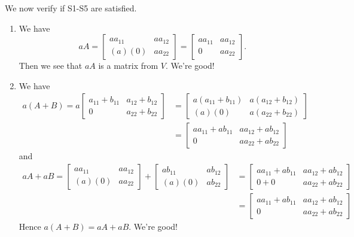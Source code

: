 \documentclass[12pt]{article}
\begin{document}
\begin{enumerate}
		We now verify if S1-S5 are satisfied.
			\begin{enumerate}[label=S\arabic*.]
				\item We have 
					\[
						a A = \begin{bmatrix} a a_{11} & a a_{12} \\ (a)(0) & a a_{22} \end{bmatrix} = \begin{bmatrix} a a_{11} & a a_{12} \\ 0 & a a_{22} \end{bmatrix} .
					\]
				Then we see that $aA$ is a matrix from $V$. We're good!
				\item We have
					\begin{align*}
						a (A + B) = a \begin{bmatrix} a_{11} + b_{11} & a_{12} + b_{12} \\ 0 & a_{22} + b_{22} \end{bmatrix} &= \begin{bmatrix} a (a_{11} + b_{11}) & a (a_{12} + b_{12}) \\ (a) (0) & a (a_{22} + b_{22} ) \end{bmatrix} \\ 
						&= \begin{bmatrix} a a_{11} + a b_{11} & a a_{12} + a b_{12} \\ 0 & a a_{22} + a b_{22} \end{bmatrix} 
					\end{align*}
				and
					\begin{align*}
						aA + aB = \begin{bmatrix} a a_{11} & a a_{12} \\ (a) (0) & a a_{22} \end{bmatrix} + \begin{bmatrix} a b_{11} & a b_{12} \\ (a) (0) & a b_{22} \end{bmatrix} &= \begin{bmatrix} aa_{11} + a b_{11} & a a_{12} + a b_{12} \\ 0 + 0 & a a_{22} + a b_{22} \end{bmatrix} \\ 
						&= \begin{bmatrix} aa_{11} + a b_{11} & a a_{12} + a b_{12} \\ 0  & a a_{22} + a b_{22} \end{bmatrix}
					\end{align*}
				Hence $a (A + B) = aA + aB$. We're good!

\end{enumerate}
\end{enumerate}
\end{document}
